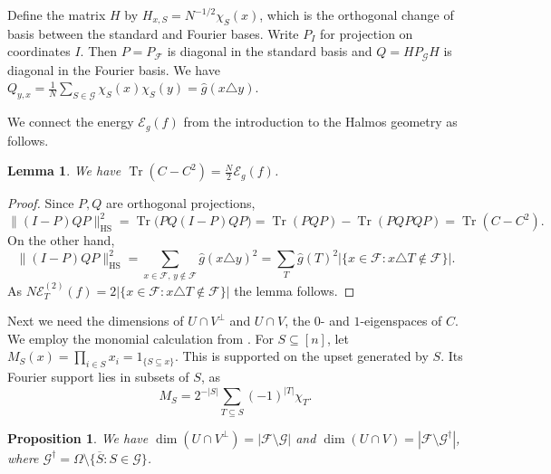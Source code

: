 \documentclass{article}
\theoremstyle{plain}
\newtheorem{prop}[theo]{Proposition}
\newtheorem{lemma}[theo]{Lemma}
\theoremstyle{definition}
\newcommand{\mc}[1]{\mathcal{#1}}
\newcommand{\sub}{\subseteq}
\newcommand{\sm}{\setminus}
\newcommand{\ov}{\overline}
\newcommand{\cE}{\mathcal E}
\newcommand{\OO}{\Omega}
\newcommand{\on}{\operatorname}
\begin{document}
Define the matrix $H$ by $H_{x,S} = N^{-1/2} \chi_S(x)$,
which is the orthogonal change of basis between the standard and Fourier bases.
Write $P_I$ for projection on coordinates $I$.
Then $P=P_{\mc F}$ is diagonal in the standard basis
and  $Q=HP_{\mc G}H$  is diagonal in the Fourier basis.
We have $Q_{y,x}=\frac1N\sum_{S\in\mc G}\chi_S(x)\chi_S(y) =\widehat g(x\triangle y)$.

We connect the energy $\mc E_g(f)$ from the introduction to the Halmos geometry as follows.

\begin{lemma}\label{lem:crossing-mass}
We have $\on{Tr}(C-C^2)=\frac N2\mc E_g(f)$.
\end{lemma}

\begin{proof}
Since $P,Q$ are orthogonal projections,
\[
 \|(I-P)QP\|_{\mathrm{HS}}^2
 =\on{Tr}\bigl(PQ(I-P)QP\bigr)
 =\on{Tr}(PQP)-\on{Tr}(PQPQP)
 =\on{Tr}(C-C^2).
\]
On the other hand,
\[
 \|(I-P)QP\|_{\mathrm{HS}}^2
=  \sum_{x\in\mc F,\,y\notin\mc F}\widehat g(x\triangle y)^2
= \sum_T\widehat g(T)^2|\{x\in\mc F:x\triangle T\notin\mc F\}|.
\]
As $N\cE_T^{(2)}(f)=2|\{x\in\mc F:x\triangle T\notin\mc F\}|$ the lemma follows.
\end{proof}

Next we need the dimensions of $U\cap V^\perp$ and $U\cap V$, the $0$- and $1$-eigenspaces of $C$.
We employ the monomial calculation from \cite[Lemma~3.1]{CLL}.
For $S\sub[n]$, let $M_S(x)=\prod_{i\in S}x_i=1_{\{S\sub x\}}$.  
This is supported on the upset generated by $S$.
Its Fourier support lies in subsets of $S$, as
\begin{equation}\label{eq:monomial-expansion}
 M_S=2^{-|S|}\sum_{T\sub S}(-1)^{|T|}\chi_T.
\end{equation}

\begin{prop}\label{prop:endpoints}
We have $\dim(U\cap V^\perp)=|\mc F\sm\mc G|$ and $\dim(U\cap V)=|\mc F\sm\mc G^\dagger|$,
where $\mc G^\dagger=\OO\sm\{\ov S:S\in\mc G\}$.
\end{prop}
\end{document}
